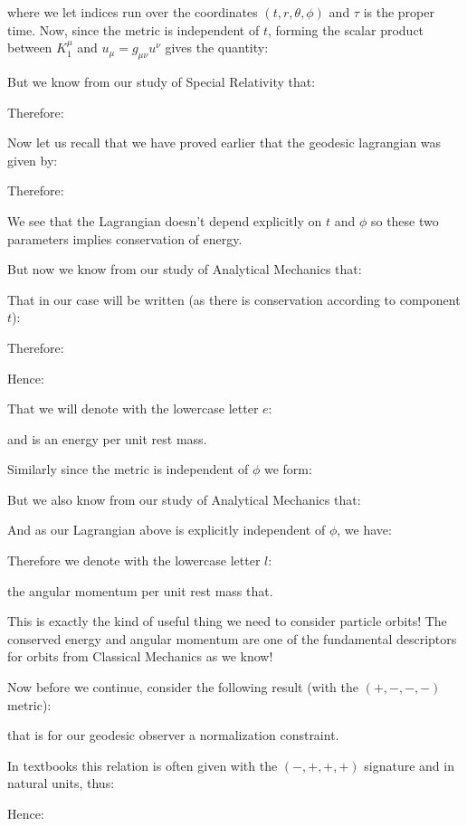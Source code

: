 	where we let indices run over the coordinates $(t,r,\theta,\phi)$ and $\tau$ is the proper time. Now, since the metric is independent of $t$, forming the scalar product between $K_1^\mu$ and $u_\mu=g_{\mu\nu}u^\nu$ gives the quantity:
	
	But we know from our study of Special Relativity that:
	
	Therefore:
	
	Now let us recall that we have proved earlier that the geodesic lagrangian was given by:
	
	Therefore:
	
	We see that the Lagrangian doesn't depend explicitly on $t$ and $\phi$ so these two parameters implies conservation of energy.
	
	But now we know from our study of Analytical Mechanics that:
	 
	That in our case will be written (as there is conservation according to component $t$):
	
	Therefore:
	
	Hence:
	
	That we will denote with the lowercase letter $e$:
	
	and is an energy per unit rest mass.
	
	Similarly since the metric is independent of $\phi$ we form:
	
	But we also know from our study of Analytical Mechanics that:
	
	And as our Lagrangian above is explicitly independent of $\phi$, we have:
	
	Therefore we denote with the lowercase letter $l$:
	
	the angular momentum per unit rest mass that.
	
	This is exactly the kind of useful thing we need to consider particle orbits! The conserved energy and angular momentum are one of the fundamental descriptors for orbits from Classical Mechanics as we know!
	
	Now before we continue, consider the following result (with the $(+, -, -, -)$ metric):
	
	that is for our geodesic observer a normalization constraint.
	\begin{tcolorbox}[title=Remark,colframe=black,arc=10pt]
	In textbooks this relation is often given with the $(-, +, +, +)$ signature and in natural units, thus:
	
	\end{tcolorbox}
	
	Hence:
	
